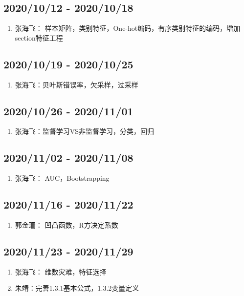 \documentclass[a4paper,12pt]{article}
\begin{document}
\subsection{2020/10/12 - 2020/10/18}
\begin{enumerate}
    \item 张海飞： 样本矩阵，类别特征，One-hot编码，有序类别特征的编码，增加section特征工程 
\end{enumerate}

\subsection{2020/10/19 - 2020/10/25}
\begin{enumerate}
    \item 张海飞：贝叶斯错误率，欠采样，过采样 
\end{enumerate}

\subsection{2020/10/26 - 2020/11/01}
\begin{enumerate}
    \item 张海飞：监督学习VS非监督学习，分类，回归 
\end{enumerate}

\subsection{2020/11/02 - 2020/11/08}
\begin{enumerate}
    \item 张海飞： AUC，Bootstrapping
\end{enumerate}

\subsection{2020/11/16 - 2020/11/22}
\begin{enumerate}
    \item 郭金珊： 凹凸函数，R方决定系数
\end{enumerate}

\subsection{2020/11/23 - 2020/11/29}
\begin{enumerate}
    \item 张海飞： 维数灾难，特征选择
    \item 朱靖：完善1.3.1基本公式，1.3.2变量定义
\end{enumerate}
\end{document}
